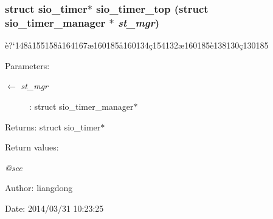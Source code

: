 \subsubsection{\setlength{\rightskip}{0pt plus 5cm}struct sio\_\-timer$\ast$ sio\_\-timer\_\-top (struct sio\_\-timer\_\-manager $\ast$ {\em st\_\-mgr})}\label{sio__timer_8h_a7}


\`{e}?`148\aa{}155158\aa{}164167\ae{}160185\aa{}160134\c{c}154132\ae{}160185\`{e}138130\c{c}130185 

\begin{Desc}
\item[Parameters:]
\begin{description}
\item[\mbox{$\leftarrow$} {\em st\_\-mgr}]: struct sio\_\-timer\_\-manager$\ast$ \end{description}
\end{Desc}
\begin{Desc}
\item[Returns:]struct sio\_\-timer$\ast$ \end{Desc}
\begin{Desc}
\item[Return values:]
\begin{description}
\item[{\em @see}]\end{description}
\end{Desc}
\begin{Desc}
\item[Author:]liangdong \end{Desc}
\begin{Desc}
\item[Date:]2014/03/31 10:23:25 \end{Desc}
